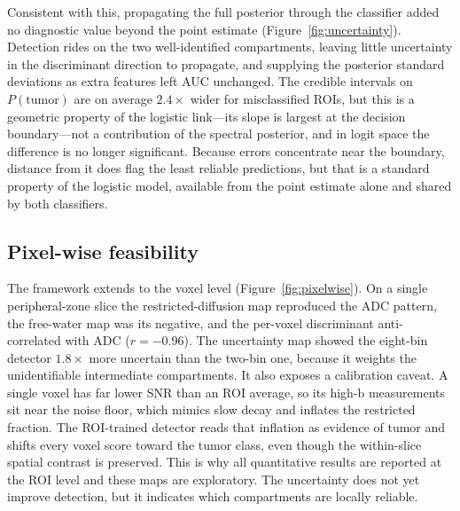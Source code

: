 Consistent with this, propagating the full posterior through the classifier added no diagnostic value beyond the point estimate (Figure~\ref{fig:uncertainty}). Detection rides on the two well-identified compartments, leaving little uncertainty in the discriminant direction to propagate, and supplying the posterior standard deviations as extra features left AUC unchanged.
The credible intervals on $P(\mathrm{tumor})$ are on average $2.4\times$ wider for misclassified ROIs, but this is a geometric property of the logistic link---its slope is largest at the decision boundary---not a contribution of the spectral posterior, and in logit space the difference is no longer significant.
Because errors concentrate near the boundary, distance from it does flag the least reliable predictions, but that is a standard property of the logistic model, available from the point estimate alone and shared by both classifiers.

\subsection{Pixel-wise feasibility}
The framework extends to the voxel level (Figure~\ref{fig:pixelwise}).
On a single peripheral-zone slice the restricted-diffusion map reproduced the ADC pattern, the free-water map was its negative, and the per-voxel discriminant anti-correlated with ADC ($r = -0.96$). The uncertainty map showed the eight-bin detector $1.8\times$ more uncertain than the two-bin one, because it weights the unidentifiable intermediate compartments.
It also exposes a calibration caveat. A single voxel has far lower SNR than an ROI average, so its high-b measurements sit near the noise floor, which mimics slow decay and inflates the restricted fraction. The ROI-trained detector reads that inflation as evidence of tumor and shifts every voxel score toward the tumor class, even though the within-slice spatial contrast is preserved. This is why all quantitative results are reported at the ROI level and these maps are exploratory. The uncertainty does not yet improve detection, but it indicates which compartments are locally reliable.

